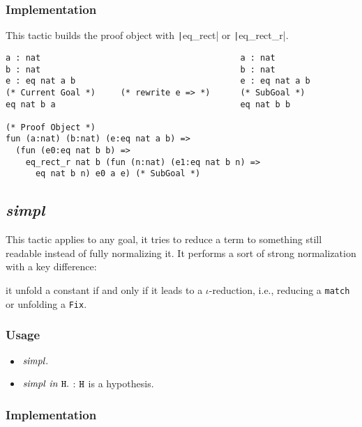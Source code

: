 \subsubsection*{Implementation}
This tactic builds the proof object with \texttt|eq_rect| or \texttt|eq_rect_r|.

\begin{center}
\begin{minipage}{0.7\textwidth}
\begin{verbatim}
a : nat                                        a : nat        
b : nat                                        b : nat        
e : eq nat a b                                 e : eq nat a b
(* Current Goal *)     (* rewrite e => *)      (* SubGoal *)
eq nat b a                                     eq nat b b

(* Proof Object *)
fun (a:nat) (b:nat) (e:eq nat a b) =>
  (fun (e0:eq nat b b) =>
    eq_rect_r nat b (fun (n:nat) (e1:eq nat b n) =>
      eq nat b n) e0 a e) (* SubGoal *)
\end{verbatim}
\end{minipage}
\end{center}

\subsection{\it simpl}
This tactic applies to any goal, it tries to reduce a term to something still readable instead of fully normalizing it. 
It performs a sort of strong normalization with a key difference:
\begin{center}
\begin{minipage}{0.7\textwidth}
it unfold a constant if and only if it leads to a $\iota$-reduction, i.e., reducing a {\tt match} or unfolding a {\tt Fix}.
\end{minipage}
\end{center}


\subsubsection*{Usage}
\begin{itemize}
\item ${\it simpl}.$
\item ${\it simpl\ in}\ \tt H.$ : $\tt H$ is a hypothesis.
\end{itemize}

\subsubsection*{Implementation}


